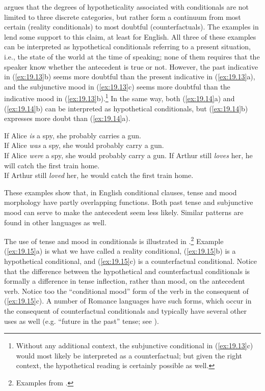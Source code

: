 \citet{Comrie1986} argues that the degrees of hypotheticality associated with conditionals are not limited to three discrete categories, but rather form a continuum from most certain (reality conditionals) to most doubtful (counterfactuals). The examples in  lend some support to this claim, at least for English. All three of these examples can be interpreted as hypothetical conditionals referring to a present situation, i.e., the state of the world at the time of speaking; none of them requires that the speaker know whether the antecedent is true or not. However, the past indicative in (\ref{ex:19.13}b) seems more doubtful than the present indicative in (\ref{ex:19.13}a), and the subjunctive mood in (\ref{ex:19.13}c) seems more doubtful than the indicative mood in (\ref{ex:19.13}b).\footnote{Without any additional context, the subjunctive conditional in (\ref{ex:19.13}c) would most likely be interpreted as a counterfactual; but given the right context, the hypothetical reading is certainly possible as well.} In the same way, both (\ref{ex:19.14}a) and (\ref{ex:19.14}b) can be interpreted as hypothetical conditionals, but (\ref{ex:19.14}b) expresses more doubt than (\ref{ex:19.14}a).


\ea \label{ex:19.13}
\ea  If Alice \textit{is} a spy, she probably carries a gun.\\
\ex If Alice \textit{was} a spy, she would probably carry a gun.\\
\ex If Alice \textit{were} a spy, she would probably carry a gun.
   \z
\ex \label{ex:19.14}
\ea  If Arthur still \textit{loves} her, he will catch the first train home.\\
\ex If Arthur still \textit{loved} her, he would catch the first train home.
   \z
\z


These examples show that, in English conditional clauses, tense and mood morphology have partly overlapping functions. Both past tense and subjunctive mood can serve to make the antecedent seem less likely. Similar patterns are found in other languages as well.



The use of tense and mood in  conditionals is illustrated in .\footnote{Examples from \citet{Gomes2008}.} Example (\ref{ex:19.15}a) is what we have called a reality conditional, (\ref{ex:19.15}b) is a hypothetical conditional, and (\ref{ex:19.15}c) is a counterfactual conditional. Notice that the difference between the hypothetical and counterfactual conditionals is formally a difference in tense inflection, rather than mood, on the antecedent verb. Notice too the “conditional mood” form of the verb in the consequent of (\ref{ex:19.15}c). A number of Romance languages have such forms, which occur in the consequent of counterfactual conditionals and typically have several other uses as well (e.g. “future in the past” tense; see ).


